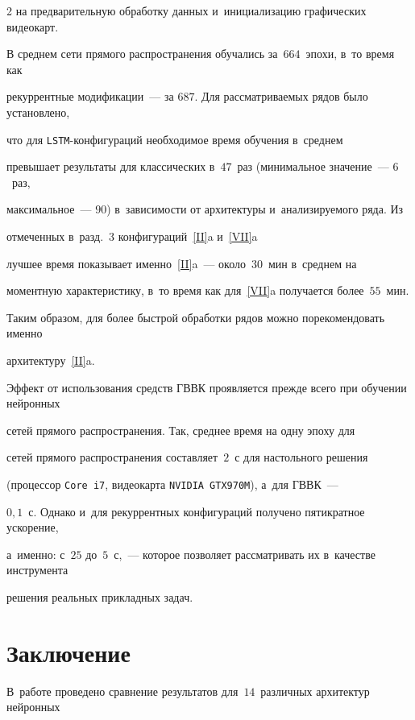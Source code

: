 \begin{multicols}{2}
на предварительную обработку данных и~инициализацию графических видеокарт. 







В среднем сети прямого распространения обуча\-лись за~$664$~эпохи, в~то время как 

рекуррентные модификации~--- за $687$. Для рассматриваемых рядов было установлено, 

что для \verb"LSTM"-кон\-фи\-гу\-ра\-ций необходимое время обучения в~среднем 

превышает результаты для классических в~$47$~раз (минимальное значение~--- $6$~раз, 

максимальное~--- $90$) в~за\-ви\-си\-мости от архитектуры и~анализируемого ряда. Из  

отмеченных в~разд.~3 конфигураций~\ref{II}{a} и~\ref{VII}{a} 

лучшее время показывает именно~\ref{II}{a}~--- около~$30$~мин в~среднем на 

моментную характеристику, в~то время как для~\ref{VII}{a} получается более~$55$~мин. 

Таким образом, для более быстрой обработки рядов можно порекомендовать именно 

архитектуру~\ref{II}{a}.



Эффект от использования средств ГВВК проявляется прежде всего при обучении нейронных 

сетей прямого распространения. Так, среднее время на одну эпоху для 

сетей прямого распространения составляет~$2$~с для настольного решения 

(процессор \verb"Core i7", видеокарта \verb"NVIDIA GTX970M"), а~для ГВВК~--- 

$0{,}1$~с. Однако и~для рекуррентных конфигураций получено пятикратное ускорение,

 а~именно: с~$25$ до~$5$~с,~--- которое позволяет рассматривать их в~качестве инструмента 

 решения реальных прикладных задач.





\section{Заключение}



В~работе проведено сравнение результатов для~$14$~различных архитектур нейронных 


\end{multicols}
